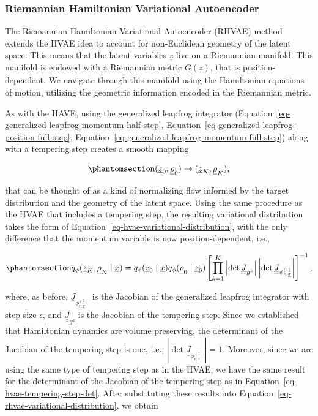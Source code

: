 \documentclass[
]{scrartcl}
\begin{document}
\begin{refsection}
\subsubsection{Riemannian Hamiltonian Variational
Autoencoder}\label{riemannian-hamiltonian-variational-autoencoder}

The Riemannian Hamiltonian Variational Autoencoder (RHVAE) method
extends the HVAE idea to account for non-Euclidean geometry of the
latent space. This means that the latent variables \(\underline{z}\)
live on a Riemannian manifold. This manifold is endowed with a
Riemannian metric \(\underline{\underline{G}}(\underline{z})\), that is
position-dependent. We navigate through this manifold using the
Hamiltonian equations of motion, utilizing the geometric information
encoded in the Riemannian metric.

As with the HAVE, using the generalized leapfrog integrator
(Equation~\ref{eq-generalized-leapfrog-momentum-half-step},
Equation~\ref{eq-generalized-leapfrog-position-full-step},
Equation~\ref{eq-generalized-leapfrog-momentum-full-step}) along with a
tempering step creates a smooth mapping

\begin{equation}\phantomsection\label{eq-rhvae-mapping}{
(\underline{z}_0, \underline{\rho}_0) \rightarrow 
(\underline{z}_K, \underline{\rho}_K),
}\end{equation}

that can be thought of as a kind of normalizing flow informed by the
target distribution and the geometry of the latent space. Using the same
procedure as the HVAE that includes a tempering step, the resulting
variational distribution takes the form of
Equation~\ref{eq-hvae-variational-distribution}, with the only
difference that the momentum variable is now position-dependent, i.e.,

\begin{equation}\phantomsection\label{eq-rhvae-variational-distribution}{
q_{\phi}(\underline{z}_K, \underline{\rho}_K \mid \underline{x}) = 
q_{\phi}(\underline{z}_0 \mid \underline{x}) 
q_{\phi}(\underline{\rho}_0 \mid \underline{z}_0) 
\left[
    \prod_{k=1}^{K} 
    \left| \det \underline{\underline{J}}_{g^k} \right|
    \left| \det \underline{\underline{J}}_{\phi_{\epsilon,\underline{x}}^{(1)}} \right|
\right]^{-1},
}\end{equation}

where, as before,
\(\underline{\underline{J}}_{\phi_{\epsilon,\underline{x}}^{(1)}}\) is
the Jacobian of the generalized leapfrog integrator with step size
\(\epsilon\), and \(\underline{\underline{J}}_{g^k}\) is the Jacobian of
the tempering step. Since we established that Hamiltonian dynamics are
volume preserving, the determinant of the Jacobian of the tempering step
is one, i.e., \(\left| \det
\underline{\underline{J}}_{\phi_{\epsilon,\underline{x}}^{(1)}} \right| = 1\).
Moreover, since we are using the same type of tempering step as in the
HVAE, we have the same result for the determinant of the Jacobian of the
tempering step as in Equation~\ref{eq-hvae-tempering-step-det}. After
substituting these results into
Equation~\ref{eq-rhvae-variational-distribution}, we obtain


\end{refsection}
\end{document}
